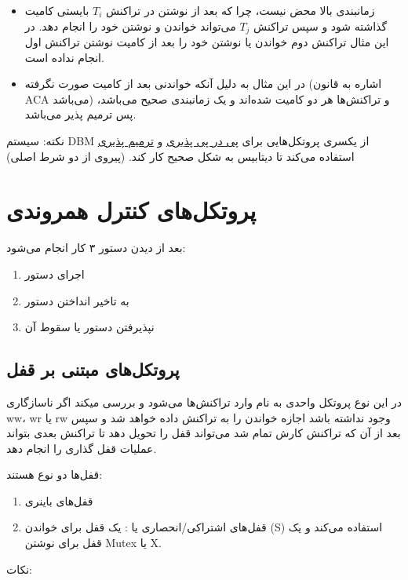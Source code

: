 \documentclass[a4paper]{article}
\begin{document}
\begin{itemize}
    \item زمانبندی بالا محض نیست، چرا که بعد از نوشتن در تراکنش $T_i$ بایستی
    کامیت گذاشته شود و سپس تراکنش $T_j$ می‌تواند خواندن و نوشتن خود را انجام
    دهد. در این مثال تراکنش دوم خواندن یا نوشتن خود را بعد از کامیت نوشتن تراکنش
    اول انجام نداده است.
    \item در این مثال به دلیل آنکه خواندنی بعد از کامیت صورت نگرفته (اشاره به
    قانون ACA می‌باشد) و تراکنش‌ها هر دو کامیت شده‌اند و یک زمانبندی صحیح
    می‌باشد، پس ترمیم پذیر می‌باشد.
\end{itemize}

نکته: سیستم DBM از یکسری پروتکل‌هایی برای \underline{پی در پی پذیری} و
\underline{ترمیم پذیری} استفاده می‌کند تا دیتابیس به شکل صحیح کار کند. (پیروی از
دو شرط اصلی)

\section{پروتکل‌های کنترل همروندی}

بعد از دیدن دستور ۳ کار انجام می‌شود:

\begin{enumerate}
    \item اجرای دستور
    \item به تاخیر انداختن دستور
    \item نپذیرفتن دستور یا سقوط آن
\end{enumerate}

\subsection{پروتکل‌های مبتنی بر قفل}

در این نوع پروتکل واحدی به نام  وارد تراکنش‌ها می‌شود و بررسی
میکند اگر ناسازگاری ww، wr یا rw وجود نداشته باشد اجازه خواندن را به تراکنش داده
خواهد شد و سپس بعد از آن که تراکنش کارش تمام شد می‌تواند قفل را تحویل دهد تا
تراکنش بعدی بتواند عملیات قفل گذاری را انجام دهد.

قفل‌ها دو نوع هستند:

\begin{enumerate}
    \item قفل‌های باینری
    \item قفل‌های اشتراکی/انحصاری یا : یک قفل برای
    خواندن (S) استفاده می‌کند و یک قفل برای نوشتن Mutex یا X.
\end{enumerate}

نکات: 
\end{document}
